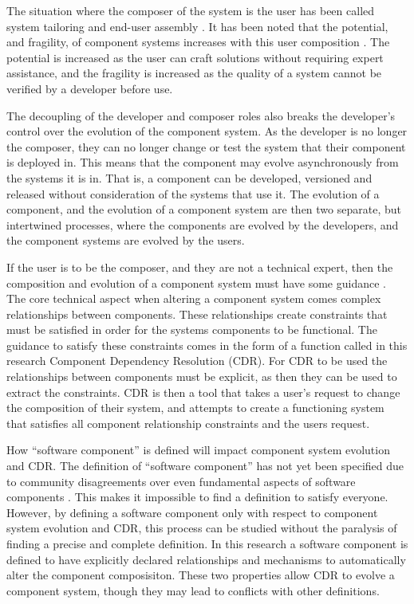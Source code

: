 The situation where the composer of the system is the user has been called system tailoring \citep{Morch1997} and end-user assembly \citep{Szyperski2002}. 
It has been noted that the potential, and fragility, of component systems increases with this user composition \citep{Szyperski2002}.
The potential is increased as the user can craft solutions without requiring expert assistance,
and the fragility is increased as the quality of a system cannot be verified by a developer before use.

The decoupling of the developer and composer roles also breaks the developer's control over the evolution of the component system.
As the developer is no longer the composer, they can no longer change or test the system that their component is deployed in.
This means that the component may evolve asynchronously from the systems it is in.
That is, a component can be developed, versioned and released without consideration of the systems that use it.
The evolution of a component, and the evolution of a component system are then two separate, but intertwined processes,
where the components are evolved by the developers, and the component systems are evolved by the users.

If the user is to be the composer, and they are not a technical expert, then the composition and evolution of a component system must have some guidance \citep{Szyperski2002}.
The core technical aspect when altering a component system comes complex relationships between components.
These relationships create constraints that must be satisfied in order for the systems components to be functional.
The guidance to satisfy these constraints comes in the form of a function called in this research Component Dependency Resolution (CDR).
For CDR to be used the relationships between components must be explicit, as then they can be used to extract the constraints.
CDR is then a tool that takes a user's request to change the composition of their system, and attempts to create a functioning system 
that satisfies all component relationship constraints and the users request.

How ``software component'' is defined will impact component system evolution and CDR.
The definition of ``software component'' has not yet been specified due to community disagreements over even fundamental aspects of software components \citep{Meyer1999,Szyperski2000a, Szyperski2000, Meyer2000}.
This makes it impossible to find a definition to satisfy everyone.
However, by defining a software component only with respect to component system evolution and CDR, this process can be studied without the paralysis of finding a precise and complete definition.
In this research a software component is defined to have explicitly declared relationships and mechanisms to automatically alter the component composisiton.
These two properties allow CDR to evolve a component system, though they may lead to conflicts with other definitions. 

